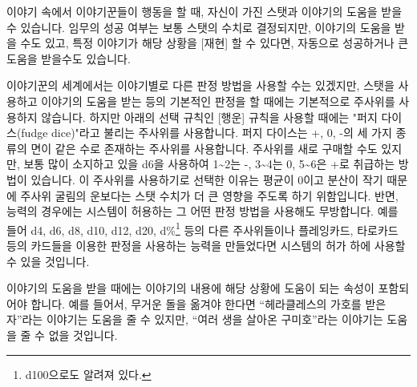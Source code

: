 \documentclass{report}
\begin{document}
	
	이야기 속에서 이야기꾼들이 행동을 할 때, 자신이 가진 스탯과 이야기의 도움을 받을 수 있습니다. 임무의 성공 여부는 보통 스탯의 수치로 결정되지만, 이야기의 도움을 받을 수도 있고, 특정 이야기가 해당 상황을 [재현] 할 수 있다면, 자동으로 성공하거나 큰 도움을 받을수도 있습니다.
	
	\bigskip
	
	이야기꾼의 세계에서는 이야기별로 다른 판정 방법을 사용할 수는 있겠지만, 스탯을 사용하고 이야기의 도움을 받는 등의 기본적인 판정을 할 때에는 기본적으로 주사위를 사용하지 않습니다. 하지만 아래의 선택 규칙인 [행운] 규칙을 사용할 때에는 "퍼지 다이스(fudge dice)"라고 불리는 주사위를 사용합니다. 퍼지 다이스는 +, 0, -의 세 가지 종류의 면이 같은 수로 존재하는 주사위를 사용합니다. 주사위를 새로 구매할 수도 있지만, 보통 많이 소지하고 있을 d6을 사용하여 1\textasciitilde2는 -, 3\textasciitilde4는 0, 5\textasciitilde6은 +로 취급하는 방법이 있습니다. 이 주사위를 사용하기로 선택한 이유는 평균이 0이고 분산이 작기 때문에 주사위 굴림의 운보다는 스탯 수치가 더 큰 영향을 주도록 하기 위함입니다. 반면, 능력의 경우에는 시스템이 허용하는 그 어떤 판정 방법을 사용해도 무방합니다. 예를 들어 d4, d6, d8, d10, d12, d20, d\%\footnote{d100으로도 알려져 있다.} 등의 다른 주사위들이나 플레잉카드, 타로카드 등의 카드들을 이용한 판정을 사용하는 능력을 만들었다면 시스템의 허가 하에 사용할 수 있을 것입니다.
	
	\bigskip
	
	이야기의 도움을 받을 때에는 이야기의 내용에 해당 상황에 도움이 되는 속성이 포함되어야 합니다. 예를 들어서, 무거운 돌을 옮겨야 한다면 “헤라클레스의 가호를 받은 자”라는 이야기는 도움을 줄 수 있지만, “여러 생을 살아온 구미호”라는 이야기는 도움을 줄 수 없을 것입니다.
	
\end{document}
